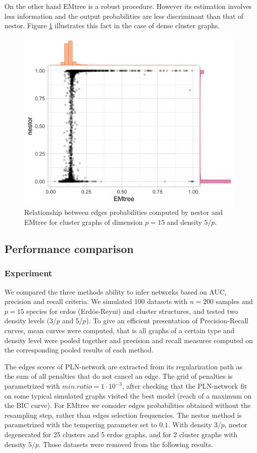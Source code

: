 \begin{subappendices}
On the other hand EMtree is a robust procedure. However its estimation involves less information and the output probabilities are less discriminant than that of nestor. Figure \ref{compar:prob} illustrates this fact in the case of dense cluster graphs.
\begin{figure}
\centering
\includegraphics[width=0.6\linewidth]{figs/probEM_nestor.png}
\caption{Relationship between edges probabilities computed by nestor and EMtree for cluster graphs of dimension $p=15$ and density $5/p$.}
\label{compar:prob}
\end{figure}

\tocless\subsection{Performance comparison}
\subsubsection*{Experiment}
We compared the three methods ability to infer networks based on AUC,  precision and recall criteria. We simulated 100 datasets with $n=200$ samples  and $p=15$ species for erdos (Erdös-Reyni) and cluster structures, and tested two density levels ($3/p$ and $5/p$).  To give an efficient presentation of Precision-Recall curves, mean curves were computed, that is all graphs of a certain type and density level were pooled together and precision and recall measures computed on the corresponding pooled results of each method.

The edges scores of PLN-network are extracted from its regularization path as the sum of all penalties that do not cancel an edge. The grid of penalties is parametrized with $min.ratio=1\cdot 10^{-3}$, after checking that the PLN-network fit on some typical simulated graphs visited the best model (reach of a maximum on the BIC curve). For EMtree we consider edges probabilities obtained without the resampling step, rather than edges selection frequencies. The nestor method is parametrized with the tempering parameter set to $0.1$. With density $3/p$, nestor degenerated for 25 clusters and 5 erdos graphs, and for 2 cluster graphs with density $5/p$.  Those datasets were removed from the following results.



\end{subappendices}
